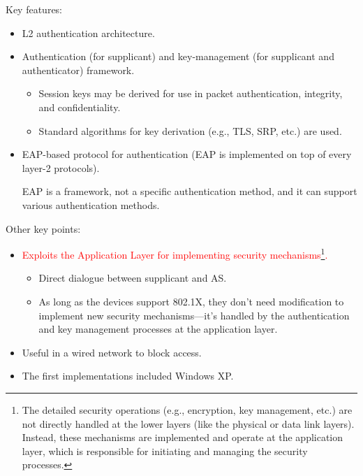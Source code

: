 Key features:
\begin{itemize}
    \item L2 authentication architecture.
    \item Authentication (for supplicant) and key-management (for supplicant and authenticator) framework.
    \begin{itemize}
        \item Session keys may be derived for use in packet authentication, integrity, and confidentiality.
        \item Standard algorithms for key derivation (e.g., TLS, SRP, etc.) are used.
    \end{itemize}
    \item EAP-based protocol for authentication (EAP is implemented on top of every layer-2 protocols).
    \begin{tcolorbox}[colback=red!10!white, colframe=red!70!black, coltitle=white, title=Be aware] 
        EAP is a framework, not a specific authentication method, and it can support various authentication methods.
    \end{tcolorbox}
\end{itemize}

Other key points:
\begin{itemize}
    \item \textcolor{red}{Exploits the Application Layer for implementing security mechanisms\footnote{The detailed security operations (e.g., encryption, key management, etc.) are not directly handled at the lower layers (like the physical or data link layers). Instead, these mechanisms are implemented and operate at the application layer, which is responsible for initiating and managing the security processes.}.}
    \begin{itemize}
        \item Direct dialogue between supplicant and AS.
        \item As long as the devices support 802.1X, they don’t need modification to implement new security mechanisms—it’s handled by the authentication and key management processes at the application layer.
    \end{itemize}
    \item Useful in a wired network to block access.
    \item The first implementations included Windows XP.
\end{itemize}

